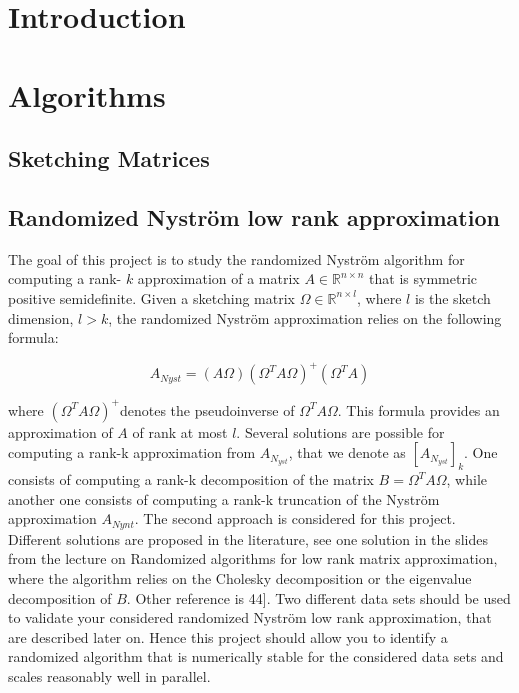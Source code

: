 \documentclass[a4paper, 12pt,oneside]{article}
\begin{document}
 
	 
	\clearpage
	\tableofcontents
	\thispagestyle{empty}
	\clearpage
	\setcounter{page}{1}

	\section{Introduction}
		\lipsum[1]
	\section{Algorithms}
        \subsection{Sketching Matrices}
        \subsection{Randomized Nyström low rank approximation}
		The goal of this project is to study the randomized Nyström algorithm for computing a rank- $k$ approximation of a matrix $A \in \mathbb{R}^{n \times n}$ that is symmetric positive semidefinite. Given a sketching matrix $\Omega \in \mathbb{R}^{n \times l}$, where $l$ is the sketch dimension, $l>k$, the randomized Nyström approximation relies on the following formula:

		$$
		A_{N y s t}=(A \Omega)\left(\Omega^T A \Omega\right)^{+}\left(\Omega^T A\right)
		$$
		
		where $\left(\Omega^T A \Omega\right)^{+}$denotes the pseudoinverse of $\Omega^T A \Omega$. This formula provides an approximation of $A$ of rank at most $l$. Several solutions are possible for computing a rank-k approximation from $A_{N_{y s t}}$, that we denote as $[A_{N_{y s t}}]_k$. One consists of computing a rank-k decomposition of the matrix $B=\Omega^T A \Omega$, while another one consists of computing a rank-k truncation of the Nyström approximation $A_{N y n t}$. The second approach is considered for this project. Different solutions are proposed in the literature, see one solution in the slides from the lecture on Randomized algorithms for low rank matrix approximation, where the algorithm relies on the Cholesky decomposition or the eigenvalue decomposition of $B$. Other reference is 44]. Two different data sets should be used to validate your considered randomized Nyström low rank approximation, that are described later on. Hence this project should allow you to identify a randomized algorithm that is numerically stable for the considered data sets and scales reasonably well in parallel.
\end{document}
